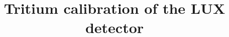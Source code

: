 \documentclass[twocolumn,superscriptaddress]{revtex4-1}
\begin{document}
\title{Tritium calibration of the LUX detector}





\maketitle



%





\appendix











\end{document}
